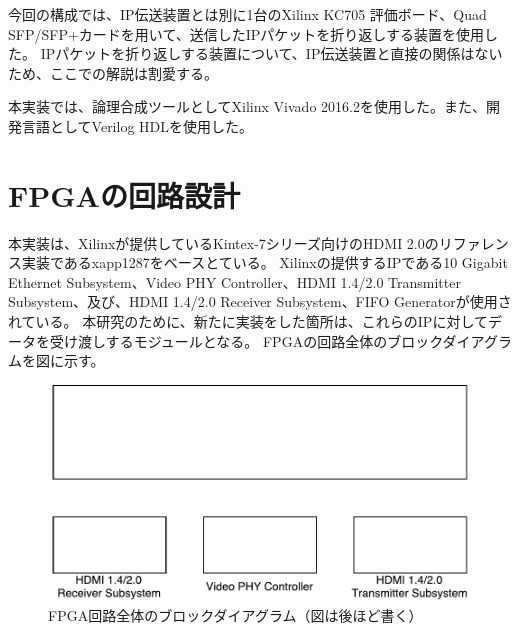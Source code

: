
今回の構成では、IP伝送装置とは別に1台のXilinx KC705 評価ボード、Quad SFP/SFP+カードを用いて、送信したIPパケットを折り返しする装置を使用した。
IPパケットを折り返しする装置について、IP伝送装置と直接の関係はないため、ここでの解説は割愛する。

本実装では、論理合成ツールとしてXilinx Vivado 2016.2を使用した。また、開発言語としてVerilog HDLを使用した。

\section{FPGAの回路設計}

本実装は、Xilinxが提供しているKintex-7シリーズ向けのHDMI 2.0のリファレンス実装であるxapp1287\cite{xilinx-xapp1287}をベースとている。
Xilinxの提供するIPである10 Gigabit Ethernet Subsystem\cite{xilinx-pg157}、Video PHY Controller\cite{xilinx-pg230}、HDMI 1.4/2.0 Transmitter Subsystem\cite{xilinx-pg235}、及び、HDMI 1.4/2.0 Receiver Subsystem\cite{xilinx-pg236}、FIFO Generator\cite{xilinx-pg057}が使用されている。
本研究のために、新たに実装をした箇所は、これらのIPに対してデータを受け渡しするモジュールとなる。
FPGAの回路全体のブロックダイアグラムを図\label{fig:fpga-whole-diagram}に示す。

\begin{figure}[htbp]
  \begin{center}
    \includegraphics[bb=0 0 452 229,width=15.5cm]{img/fpga-whole-diagram.pdf}
  \end{center}
  \caption{FPGA回路全体のブロックダイアグラム（図は後ほど書く）}
  \label{fig:fpga-whole-diagram}
\end{figure}

